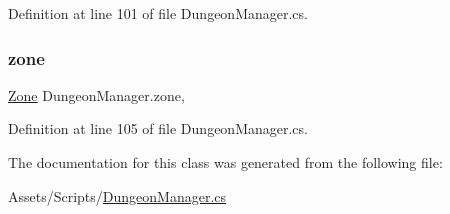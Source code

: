 Definition at line 101 of file Dungeon\+Manager.\+cs.

\mbox{\label{class_dungeon_manager_a4a1b9933b14faea37aeb07bd6f290774}} 
\subsubsection{\texorpdfstring{zone}{zone}}
{\footnotesize\ttfamily \mbox{\hyperlink{class_dungeon_manager_a6558d4a01889674bf25c798f1b90a431}{Zone}} Dungeon\+Manager.\+zone\hspace{0.3cm}{\ttfamily [get]}, {\ttfamily [set]}}



Definition at line 105 of file Dungeon\+Manager.\+cs.



The documentation for this class was generated from the following file\+:\begin{DoxyCompactItemize}
\item 
Assets/\+Scripts/\mbox{\hyperlink{_dungeon_manager_8cs}{Dungeon\+Manager.\+cs}}\end{DoxyCompactItemize}

